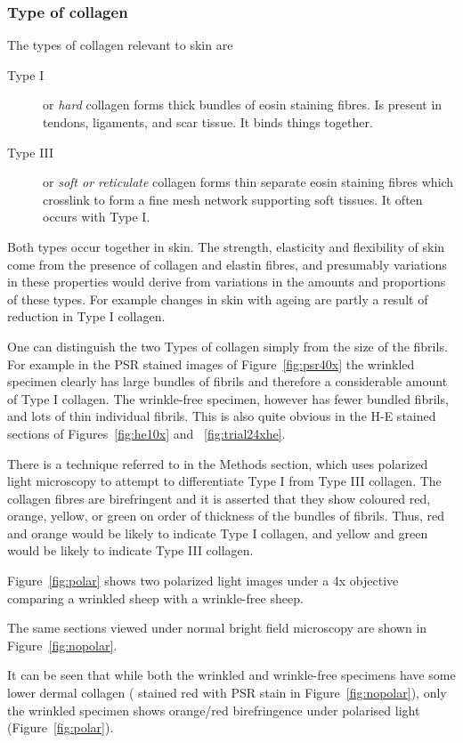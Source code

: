 \documentclass[titlepage]{article}  %
\begin{document}
\subsubsection{Type of collagen}
The types of collagen relevant to skin are
\begin{description}
\item[Type I] or {\em hard} collagen forms thick bundles of eosin staining fibres. Is present in tendons, ligaments, and scar tissue. It binds things together.
\item[Type III] or {\em soft or reticulate} collagen forms thin separate  eosin staining fibres which crosslink to form a fine mesh network supporting soft tissues.  It often occurs with Type I.
\end{description}
Both types occur together in skin. The strength, elasticity  and flexibility of skin come from the presence of collagen and elastin fibres, and presumably variations in these properties would derive from variations in the amounts and proportions of these types. For example changes in skin with ageing are partly a result of reduction in Type I collagen.

One can distinguish the two Types of collagen simply from the size of the fibrils. For example in  the PSR stained images of Figure~\ref{fig:psr40x} the wrinkled specimen clearly has large bundles of fibrils and therefore a considerable amount of Type I collagen. The wrinkle-free specimen, however has fewer bundled fibrils, and lots of thin individual fibrils. This is also quite obvious in the H-E stained sections of Figures~\ref{fig:he10x} and ~\ref{fig:trial24xhe}.

There is a  technique referred to in the Methods section, which uses polarized light microscopy to attempt to differentiate Type I from Type III collagen.  The collagen fibres are birefringent and it is asserted that they show coloured red, orange, yellow, or green on order of thickness of the bundles of fibrils. Thus, red and orange would be likely to indicate Type I collagen, and yellow and green would be likely to indicate Type III collagen.

Figure~\ref{fig:polar} shows two polarized light images under a 4x objective comparing a wrinkled sheep with a wrinkle-free sheep.

The same sections viewed under normal bright field microscopy are shown in Figure~\ref{fig:nopolar}. 

It can be seen that while both the wrinkled and wrinkle-free specimens have some lower dermal collagen ( stained red with PSR stain in Figure~\ref{fig:nopolar}), only the wrinkled specimen shows orange/red birefringence under polarised light (Figure~\ref{fig:polar}). 
\end{document}
